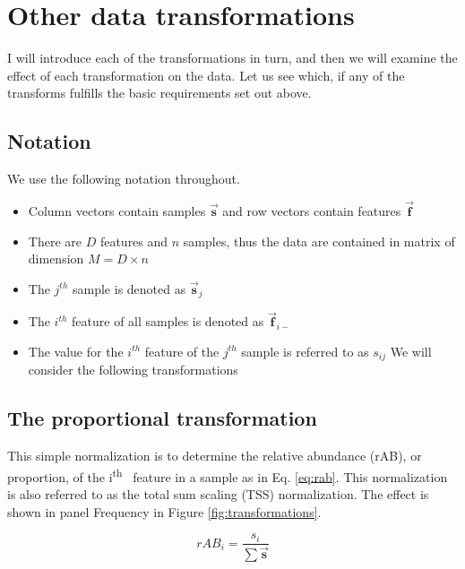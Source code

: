 \documentclass[onecolumn]{book}
\providecommand{\tightlist}{%
  \setlength{\itemsep}{0pt}\setlength{\parskip}{0pt}}
\newcommand{\ith}[1]{ #1\textsuperscript{th}\ }
\theoremstyle{definition}
\theoremstyle{definition}
\theoremstyle{definition}
\theoremstyle{remark}
\begin{document}
\hypertarget{other-data-transformations}{%
\section{Other data transformations}\label{other-data-transformations}}

I will introduce each of the transformations in turn, and then we will
examine the effect of each transformation on the data. Let us see which,
if any of the transforms fulfills the basic requirements set out above.

\hypertarget{notation}{%
\subsection{Notation}\label{notation}}

We use the following notation throughout.

\begin{itemize}
\tightlist
\item
  Column vectors contain samples \(\vec{\textbf{s}}\) and row vectors
  contain features \(\vec{\textbf{f}}\)
\item
  There are \(D\) features and \(n\) samples, thus the data are
  contained in matrix of dimension \(M = D \times n\)
\item
  The \(j^{th}\) sample is denoted as \(\vec{\textbf{s}}_{j}\)
\item
  The \(i^{th}\) feature of all samples is denoted as
  \(\vec{\textbf{f}}_{i-}\)
\item
  The value for the \(i^{th}\) feature of the \(j^{th}\) sample is
  referred to as \(s_{ij}\) We will consider the following
  transformations
\end{itemize}

\hypertarget{the-proportional-transformation}{%
\subsection{The proportional
transformation}\label{the-proportional-transformation}}

This simple normalization is to determine the relative abundance (rAB),
or proportion, of the \ith{i} feature in a sample as in Eq.
\ref{eq:rab}. This normalization is also referred to as the total sum
scaling (TSS) normalization. The effect is shown in panel Frequency in
Figure \ref{fig:transformations}.

\begin{equation}
    rAB_{i} = \frac{s_{i}}{\sum{\vec{\textbf{s}}}}
    \label{eq:rab}
\end{equation}
\end{document}
